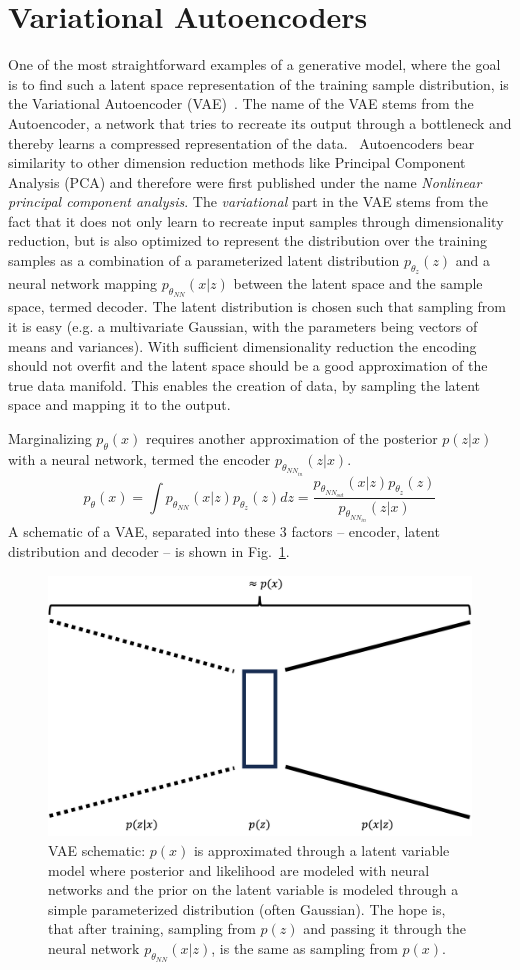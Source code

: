 \section{Variational Autoencoders}
One of the most straightforward examples of a generative model, where the goal is to find such a latent space representation of the training sample distribution, is the Variational Autoencoder (VAE)~\autocite{kingma2022autoencoding}. The name of the VAE stems from the Autoencoder, a network that tries to recreate its output through a bottleneck and thereby learns a compressed representation of the data.~\autocite{https://doi.org/10.1002/aic.690370209} Autoencoders bear similarity to other dimension reduction methods like Principal Component Analysis (PCA) and therefore were first published under the name \textit{Nonlinear principal component analysis}. The \textit{variational} part in the VAE stems from the fact that it does not only learn to recreate input samples through dimensionality reduction, but is also optimized to represent the distribution over the training samples as a combination of a parameterized latent distribution $p_{\theta_z}(z)$ and a neural network mapping $p_{\theta_{NN}}(x|z)$ between the latent space and the sample space, termed decoder. The latent distribution is chosen such that sampling from it is easy (e.g. a multivariate Gaussian, with the parameters being vectors of means and variances). With sufficient dimensionality reduction the encoding should not overfit and the latent space should be a good approximation of the true data manifold. This enables the creation of data, by sampling the latent space and mapping it to the output.

Marginalizing $p_\theta(x)$ requires another approximation of the posterior $p(z|x)$ with a neural network, termed the encoder $p_{\theta_{NN_{in}}}(z|x)$.
\begin{equation}
    p_{\theta}(x) = \int p_{\theta_{NN}}(x|z) p_{\theta_z}(z) dz = \frac{p_{\theta_{NN_{out}}}(x|z) p_{\theta_z}(z)}{p_{\theta_{NN_{in}}}(z|x)}
\end{equation}
A schematic of a VAE, separated into these 3 factors -- encoder, latent distribution and decoder -- is shown in Fig.~\ref{fig:vae}.
\begin{figure}[h]
    \centering
    \includegraphics[width=.5\textwidth]{images/vae.png}
    \caption{VAE schematic: $p(x)$ is approximated through a latent variable model where posterior and likelihood are modeled with neural networks and the prior on the latent variable is modeled through a simple parameterized distribution (often Gaussian). The hope is, that after training, sampling from $p(z)$ and passing it through the neural network $p_{\theta_{NN}}(x|z)$, is the same as sampling from $p(x)$.}
    \label{fig:vae}
\end{figure}

